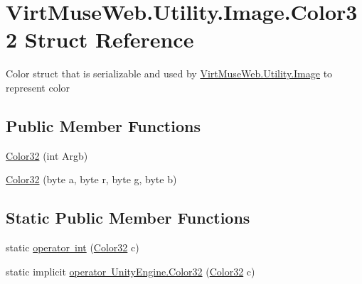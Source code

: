 \hypertarget{struct_virt_muse_web_1_1_utility_1_1_image_1_1_color32}{}\section{Virt\+Muse\+Web.\+Utility.\+Image.\+Color32 Struct Reference}
\label{struct_virt_muse_web_1_1_utility_1_1_image_1_1_color32}


Color struct that is serializable and used by \mbox{\hyperlink{class_virt_muse_web_1_1_utility_1_1_image}{Virt\+Muse\+Web.\+Utility.\+Image}} to represent color  


\subsection*{Public Member Functions}
\begin{DoxyCompactItemize}
\item 
\mbox{\hyperlink{struct_virt_muse_web_1_1_utility_1_1_image_1_1_color32_a01229f7dab8abe7d5cc188dc21b964d0}{Color32}} (int Argb)
\item 
\mbox{\hyperlink{struct_virt_muse_web_1_1_utility_1_1_image_1_1_color32_afe94ff8c63e8518b4d0d1c37e2b18e7d}{Color32}} (byte a, byte r, byte g, byte b)
\end{DoxyCompactItemize}
\subsection*{Static Public Member Functions}
\begin{DoxyCompactItemize}
\item 
static \mbox{\hyperlink{struct_virt_muse_web_1_1_utility_1_1_image_1_1_color32_a331a16a6c1ff2d93f74c5b62c2ade2b6}{operator int}} (\mbox{\hyperlink{struct_virt_muse_web_1_1_utility_1_1_image_1_1_color32}{Color32}} c)
\item 
static implicit \mbox{\hyperlink{struct_virt_muse_web_1_1_utility_1_1_image_1_1_color32_aa2463b9dc8e771821f4c47f4d2a11cc8}{operator Unity\+Engine.\+Color32}} (\mbox{\hyperlink{struct_virt_muse_web_1_1_utility_1_1_image_1_1_color32}{Color32}} c)
\end{DoxyCompactItemize}
